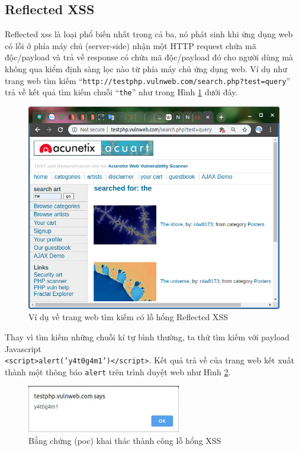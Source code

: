 \subsection{Reflected XSS}
Reflected \acrshort{xss} là loại phổ biến nhất trong cả ba, nó phát sinh khi ứng dụng web có lỗi ở phía máy chủ (server-side) nhận một HTTP request chứa mã độc/payload và trả về response có chứa mã độc/payload đó cho người dùng mà không qua kiểm định sàng lọc nào từ phía máy chủ ứng dụng web. Ví dụ như trang web tìm kiếm ``\texttt{http://testphp.vulnweb.com/search.php?test=query}'' trả về kết quả tìm kiếm chuỗi ``\texttt{the}'' như trong Hình \ref{fig:vuln-web} dưới đây.
\begin{figure}[H]
  \centering
    \includegraphics[width=\textwidth,keepaspectratio=true]{images/vuln-web.png}
  \caption{Ví dụ về trang web tìm kiếm có lỗ hổng Reflected XSS}
  \label{fig:vuln-web}
\end{figure}
Thay vì tìm kiếm những chuỗi kí tự bình thường, ta thử tìm kiếm với payload Javascript\\
\texttt{<script>alert('y4t0g4m1')</script>}. Kết quả trả về của trang web kết xuất thành một thông báo \texttt{alert} trên trình duyệt web như Hình \ref{fig:reflected-xss-poc}.
\begin{figure}[H]
  \centering
    \includegraphics[width=0.6\textwidth,keepaspectratio=true]{images/reflected-xss-poc.jpg}
  \caption{Bằng chứng (\acrshort{poc}) khai thác thành công lỗ hổng XSS}
  \label{fig:reflected-xss-poc}
\end{figure}
